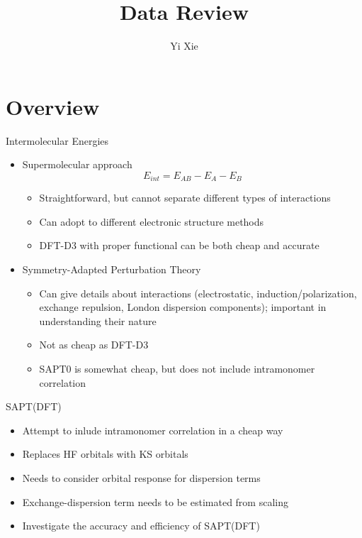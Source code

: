 \documentclass{beamer}
\title{Data Review}
\author{Yi Xie}
\begin{document}
\GTtitle

\section{Overview}

    \begin{frame}{Intermolecular Energies}
        \begin{itemize}
            \item Supermolecular approach 
                $$E_{int} = E_{AB} - E_A - E_B$$
                \begin{itemize}
                    \item Straightforward, but cannot separate different types of interactions
                    \item Can adopt to different electronic structure methods
                    \item DFT-D3 with proper functional can be both cheap and accurate
                \end{itemize}
            \item Symmetry-Adapted Perturbation Theory
            \begin{itemize}
                \item Can give details about interactions (electrostatic, induction/polarization, exchange repulsion, London dispersion components); important in understanding their nature
                \item Not as cheap as DFT-D3
                \item SAPT0 is somewhat cheap, but does not include intramonomer correlation
            \end{itemize}
        \end{itemize}
    \end{frame}

    \begin{frame}{SAPT(DFT)}
        \begin{itemize}
            \item Attempt to inlude intramonomer correlation in a cheap way
            \item Replaces HF orbitals with KS orbitals
            \item Needs to consider orbital response for dispersion terms
            \item Exchange-dispersion term needs to be estimated from scaling 
            \item Investigate the accuracy and efficiency of SAPT(DFT)
        \end{itemize}
    \end{frame}
\end{document}
